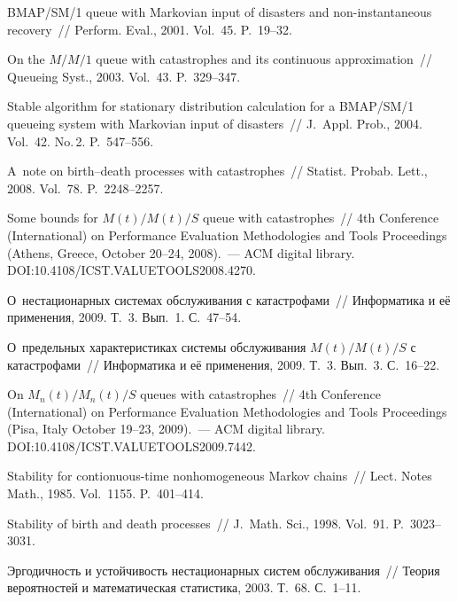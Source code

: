 \begin{multicols}{2}
{{\begin{thebibliography}{99}
BMAP/SM/1 queue with Markovian input of disasters and non-instantaneous recovery~//
Perform. Eval., 2001. Vol.~45. P.~19--32.

On the $M/M/1$ queue with catastrophes and its continuous
approximation~// Queueing Syst., 2003. Vol.~43. P.~329--347.

Stable algorithm for stationary distribution calculation for a BMAP/SM/1 queueing system 
with Markovian input of disasters~//      J.~Appl. Prob.,  2004.  Vol.~42. No.\,2.
P.~547--556.

A~note on birth--death processes with catastrophes~//  Statist.
Probab. Lett., 2008. Vol.~78.  P.~2248--2257.

Some bounds for $M(t)/M(t)/S$ queue with catastrophes~// 
4th  Conference (International) on Performance Evaluation
Methodologies and Tools Proceedings (Athens, Greece, October 20--24, 2008).~---
ACM digital library. DOI:10.4108/ICST.VALUETOOLS2008.4270.


О~нестационарных системах обслуживания с катастрофами~// Информатика и её применения, 2009. 
Т.~3. Вып.~1. С.~47--54.

О~предельных характеристиках системы обслуживания $M(t)/M(t)/S$ с катастрофами~// 
Информатика и её применения, 2009. Т.~3. Вып.~3. С.~16--22.

On $M_n(t)/M_n(t)/S$ queues with catastrophes~//  4th 
 Conference (International) on Performance Evaluation Methodologies and Tools Proceedings 
(Pisa, Italy    October 19--23, 2009).~---     ACM digital library.
DOI:10.4108/ICST.VALUETOOLS2009.7442.

 Stability for contionuous-time
nonhomogeneous Markov chains~// Lect. Notes Math.,  1985. Vol.~1155. P.~401--414.

Stability of birth and death processes~// J.~Math. Sci., 1998. Vol.~91. P.~3023--3031.

Эргодичность и устойчивость нестационарных систем обслуживания~// Теория вероятностей 
и математическая статистика, 2003. Т.~68. С.~1--11.


\end{thebibliography}}}
\end{multicols}
